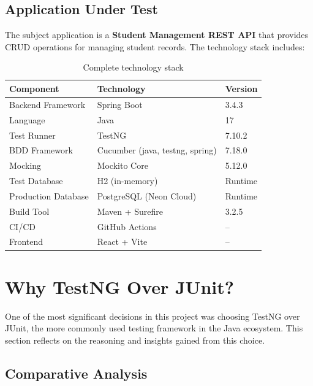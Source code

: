 \documentclass[12pt,a4paper]{article}
\begin{document}
\subsection{Application Under Test}

The subject application is a \textbf{Student Management REST API} that provides CRUD operations for managing student records. The technology stack includes:

\begin{table}[H]
\centering
\begin{tabular}{lll}
    \toprule
    \textbf{Component} & \textbf{Technology} & \textbf{Version} \\
    \midrule
    Backend Framework & Spring Boot & 3.4.3 \\
    Language & Java & 17 \\
    Test Runner & TestNG & 7.10.2 \\
    BDD Framework & Cucumber (java, testng, spring) & 7.18.0 \\
    Mocking & Mockito Core & 5.12.0 \\
    Test Database & H2 (in-memory) & Runtime \\
    Production Database & PostgreSQL (Neon Cloud) & Runtime \\
    Build Tool & Maven + Surefire & 3.2.5 \\
    CI/CD & GitHub Actions & -- \\
    Frontend & React + Vite & -- \\
    \bottomrule
\end{tabular}
\caption{Complete technology stack}
\end{table}

\section{Why TestNG Over JUnit?}

One of the most significant decisions in this project was choosing TestNG over JUnit, the more commonly used testing framework in the Java ecosystem. This section reflects on the reasoning and insights gained from this choice.

\subsection{Comparative Analysis}
\end{document}
